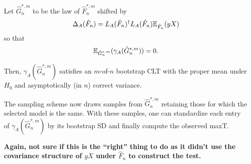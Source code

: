 \documentclass{article}
\begin{document}
Let $\hat{G}^{*,m}_n$ to be the law of 
$\hat{F}^{*,m}_n$ shifted by
$$
\Delta_A(\hat{F}_n) = L_A(\hat{F}_n)^{\dagger}L_A(\hat{F}_n) \mathbb{E}_{\hat{F}_n}(yX)
$$
so that
$$
\mathbb{E}_{\hat{G}^{*,m}_n}(\gamma_A(\hat{G}^{*,m}_n))= 0.
$$

Then, $\gamma_A(\hat{G}^{*,m}_n)$ satisfies an $m$-of-$n$ bootstrap CLT
with the proper mean under $H_0$ and asymptotically (in $n$) correct variance.

The sampling scheme now draws samples from $\hat{G}^{*,m}_n$ retaining those 
for which the selected model is the same. With these samples, one can standardize each entry of $\gamma_A(\hat{G}^{*,m}_n)$ by its bootstrap SD and finally compute the observed maxT.

{\bf Again, not sure if this is the ``right'' thing to do as it didn't
use the covariance structure of $yX$ under $\hat{F}_n$ to construct the test.}




\end{document}
